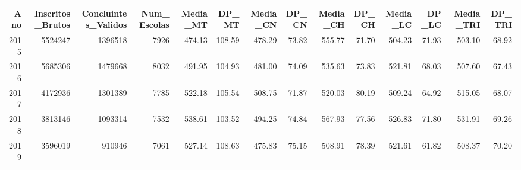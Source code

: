 \begin{tabular}{rrrrrrrrrrrrrr}
\toprule
Ano & Inscritos_Brutos & Concluintes_Validos & Num_Escolas & Media_MT & DP_MT & Media_CN & DP_CN & Media_CH & DP_CH & Media_LC & DP_LC & Media_TRI & DP_TRI \\
\midrule
2015 & 5524247 & 1396518 & 7926 & 474.13 & 108.59 & 478.29 & 73.82 & 555.77 & 71.70 & 504.23 & 71.93 & 503.10 & 68.92 \\
2016 & 5685306 & 1479668 & 8032 & 491.95 & 104.93 & 481.00 & 74.09 & 535.63 & 73.83 & 521.81 & 68.03 & 507.60 & 67.43 \\
2017 & 4172936 & 1301389 & 7785 & 522.18 & 105.54 & 508.75 & 71.87 & 520.03 & 80.19 & 509.24 & 64.92 & 515.05 & 68.07 \\
2018 & 3813146 & 1093314 & 7532 & 538.61 & 103.52 & 494.25 & 74.84 & 567.93 & 77.56 & 526.83 & 71.80 & 531.91 & 69.26 \\
2019 & 3596019 & 910946 & 7061 & 527.14 & 108.63 & 475.83 & 75.15 & 508.91 & 78.39 & 521.61 & 61.82 & 508.37 & 70.20 \\
\bottomrule
\end{tabular}
